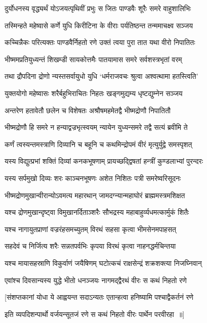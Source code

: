 \twolineshloka
{दुर्योधनस्य वृद्ध्यर्थं योऽजयत्पृथिवीं प्रभुः}
{स जितः पाण्डवैः शूरैः समरे वाहुशालिभिः}


\twolineshloka
{तस्मिन्हते महेष्वासे कर्णे युधि किरीटिना}
{के वीराः पर्यतिष्ठन्त तन्ममाचक्ष्व सञ्जय}


\twolineshloka
{कच्चिन्नैकः परित्यक्तः पाण्डवैर्निहतो रणे}
{उक्तं त्वया पुरा तात यथा वीरो निपातितः}


\twolineshloka
{भीष्ममप्रतियुध्यन्तं शिखम्डी सायकोत्तमैः}
{पातयामास समरे सर्वशस्त्रभृतां वरम्}


\twolineshloka
{तथा द्रौपदिना द्रोणो न्यस्तसर्वायुधो युधि}
{`धर्मराजवचः श्रुत्वा अश्वत्थामा हतस्त्विति'}


\twolineshloka
{युक्तयोगो महेष्वासः शरैर्बहुभिराचितः}
{निहतः खङ्गमुद्यम्य धृष्टद्युम्नेन सञ्जय}


\twolineshloka
{अन्तरेण हतावेतौ छलेन च विशेषतः}
{अश्रौषमहमेतद्वै भीष्मद्रोणौ निपातितौ}


\twolineshloka
{भीष्मद्रोणौ हि समरे न हन्याद्वज्रभृत्स्वयम्}
{न्यायेन युध्यन्समरे तद्वै सत्यं ब्रवीमि ते}


\twolineshloka
{कर्णं त्वस्यन्तमस्त्राणि दिव्यानि च बहूनि च}
{कथमिन्द्रोपमं वीरं मृत्युर्युद्वे समस्पृशत्}


\twolineshloka
{यस्य विद्युत्प्रभां शक्तिं दिव्यां कनकभूषणाम्}
{प्रायच्छद्द्विषतां हन्त्रीं कुण्डलाभ्यां पुरन्दरः}


\twolineshloka
{यस्य सर्पमुखो दिव्यः शरः काञ्चनभूषणः}
{अशेत निशितः पत्री समरेष्वरिसूदनः}


\twolineshloka
{भीष्मद्रोणमुखान्वीरान्योऽवमत्य महारथान्}
{जामदग्न्यान्महाघोरं ब्राह्ममस्त्रमशिक्षत}


\twolineshloka
{यश्च द्रोणमुखान्दृष्ट्वा विमुखानर्दिताञ्शरैः}
{सौभद्रस्य महाबाहुर्व्यधमत्कार्मुकं शितैः}


\twolineshloka
{यश्च नागायुतप्राणां वज्ररंहसमच्युतम्}
{विरथं सहसा कृत्वा भीमसेनमपाहसत्}


\twolineshloka
{सहदेवं च निर्जित्य शरैः सन्नतपर्वभिः}
{कृपया विरथं कृत्वा नाहनद्धर्मचिन्तया}


\twolineshloka
{यश्च मायासहस्राणि विकुर्वाणं जयैषिणम्}
{घटोत्कचं राक्षसेन्द्रं शक्रशक्त्या निजघ्निवान्}


\twolineshloka
{एवांश्च दिवसान्यस्य युद्धे भीतो धनञ्जयः}
{नागमद्द्वैरथं वीरः स कथं निहतो रणे}


\twolineshloka
{[संशप्तकानां योधा ये आह्वयन्त सदाऽन्यतः}
{एतान्हत्वा हनिष्यामि पश्चाद्वैकर्तनं रणे}


\twolineshloka
{इति व्यपदिशन्पार्थो वर्जयन्सूतजं रणे}
{स कथं निहतो वीरः पार्थेन परवीरहा ॥]}


